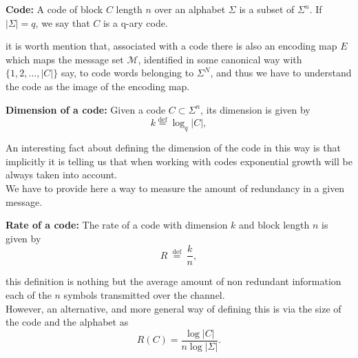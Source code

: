 \begin{definition}
  \textbf{Code:}  A code of block $C$ length $n$ over an alphabet $\Sigma$ is a subset of $\Sigma^n$.  If $|\Sigma|=q$, we say that $C$ is a q-ary code.
\end{definition}
it is worth mention that, associated with a code there is also an encoding map $E$ which maps the message set $\mathcal{M}$, identified in some canonical way with $\{1,2,\ldots,|C|\}$ say, to code words belonging to $\Sigma^N$, and thus we have to understand the code as the image of the encoding map.
\begin{definition}
  \textbf{Dimension of a code:}  Given a code $C\subset\Sigma^n$, its dimension is given by
  \begin{equation}
  k \stackrel{\mathrm{def}}{=} \log _{q}|C|,
  \label{CH2:diemnsion_of_code}
  \end{equation}
 \end{definition}
An interesting fact about defining  the dimension of the code in this way is that implicitly it is telling us that when working with codes exponential growth will be always taken into account.\\
We have to provide here a way to measure the amount of redundancy in a given message.
	\begin{definition}
	\textbf{Rate of a code:} The rate of a code with dimension $k$ and block length $n$ is given by 
	\begin{equation}
		R \stackrel{\text { def }}{=} \frac{k}{n},
	\end{equation}
	\end{definition}
this definition is nothing but the average amount of non redundant information each of the $n$ symbols transmitted over the channel.\\ However, an alternative, and more general way of defining this is via the size of the code and the alphabet as
\begin{equation}
R(C)=\frac{\log |C|}{n \log |\Sigma|}.
\end{equation}

